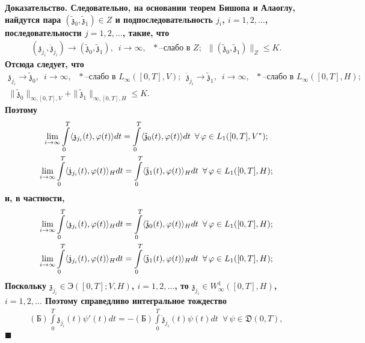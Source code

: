 \documentclass{report}
\newenvironment{Proof}{\par\noindent\bf Доказательство.\rm}{ $\blacksquare$\par}
\begin{document}
\begin{Proof}
Следовательно, на основании теорем Бишопа и Алаоглу, найдутся пара $(\tilde{\mathfrak{z}}_0,\tilde{\mathfrak{z}}_1)\in Z$ и
подпоследовательность $j_i$, $i=1,2,\dots$, последовательности $j=1,2,\dots$, такие, что
\begin{gather*}
(\mathfrak{z}_{j_i},\dot{\mathfrak{z}}_{j_i})\to(\tilde{\mathfrak{z}}_0,\tilde{\mathfrak{z}}_1),\,\,\,i\to\infty,\text{ $*$--слабо в $Z$};
\,\,\,\|(\tilde{\mathfrak{z}}_0,\tilde{\mathfrak{z}}_1)\|_Z\leqslant K.
\end{gather*}
Отсюда следует, что
\begin{gather*}
\mathfrak{z}_{j_i}\to\tilde{\mathfrak{z}}_0,\,\,\,i\to\infty,\text{ $*$--слабо в $L_\infty([0,T],V)$};\,\,\,
\dot{\mathfrak{z}}_{j_i}\to\tilde{\mathfrak{z}}_1,\,\,\,i\to\infty,\text{ $*$--слабо в $L_\infty([0,T],H)$;}\\
\|\tilde{\mathfrak{z}}_0\|_{\infty,[0,T],V}+\|\tilde{\mathfrak{z}}_1\|_{\infty,[0,T],H}\leqslant K.
\end{gather*}
Поэтому
\begin{gather*}
\lim\limits_{i\to\infty}\int\limits_0^T\langle\mathfrak{z}_{j_i}(t),\varphi(t)\rangle dt=
\int\limits_0^T\langle\tilde{\mathfrak{z}}_0(t),\varphi(t)\rangle dt\,\,\,\forall\,\varphi\in L_1([0,T],V^*);\\
\notag\lim\limits_{i\to\infty}\int\limits_0^T\langle\dot{\mathfrak{z}}_{j_i}(t),\varphi(t)\rangle_H dt=
\int\limits_0^T\langle\tilde{\mathfrak{z}}_1(t),\varphi(t)\rangle_H dt\,\,\,\forall\,\varphi\in L_1([0,T],H);
\end{gather*}
и, в частности,
\begin{gather}\label{*weak_convergence_of_mathfrak_zji_dot_mathfrak_z_ji}
\lim\limits_{i\to\infty}\int\limits_0^T\langle\mathfrak{z}_{j_i}(t),\varphi(t)\rangle_H dt=
\int\limits_0^T\langle\tilde{\mathfrak{z}}_0(t),\varphi(t)\rangle_H dt\,\,\,\forall\,\varphi\in L_1([0,T],H);\\
\notag\lim\limits_{i\to\infty}\int\limits_0^T\langle\dot{\mathfrak{z}}_{j_i}(t),\varphi(t)\rangle_H dt=
\int\limits_0^T\langle\tilde{\mathfrak{z}}_1(t),\varphi(t)\rangle_H dt\,\,\,\forall\,\varphi\in L_1([0,T],H);
\end{gather}
Поскольку $\mathfrak{z}_{j_i}\in \textrm{Э}([0,T];V,H)$, $i=1,2,\dots$, то $\mathfrak{z}_{j_i}\in W^1_\infty([0,T],H)$, $i=1,2,\dots$ Поэтому
справедливо интегральное тождество
\begin{gather*}
(\textrm{Б})\int\limits_0^T\mathfrak{z}_{j_i}(t)\psi'(t)dt=-(\textrm{Б})\int\limits_0^T\dot{\mathfrak{z}}_{j_i}(t)\psi(t)dt\,\,\,\forall\,\psi\in\mathfrak{D}(0,T),

\end{gather*}
\end{Proof}
\end{document}
